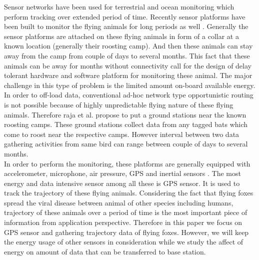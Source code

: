 \documentclass[conference]{IEEEtran}
\begin{document}
Sensor networks have been used for terrestrial \cite{robo-mote} and ocean 
monitoring \cite{Vasilescu05krill:an} which perform tracking over extended period of time. 
Recently sensor platforms have been built to monitor the flying animals for long periods as well 
\cite{Anthony:2012:STC:2185677.2185747} \cite{raja-ipsn}. Generally the sensor platforms are 
attached on these flying animals in form of a collar at a known location (generally their roosting 
camp). And then these animals can stay away from the camp from couple of days to several months. 
This fact that these animals can be away for months without connectivity call for the design of delay 
tolerant hardware and software platform for monitoring these animal. The major challenge in this type 
of problem is the limited amount on-board available energy. \\
In order to off-load data, conventional ad-hoc network type opportunistic routing is not 
possible because of highly unpredictable flying nature of these flying animals. Therefore raja et 
al.\cite{raja-ipsn} propose to put a ground stations near the known roosting camps. These 
ground stations collect data from any tagged bats which come to roost near the respective camps. 
However interval between two data gathering activities from same bird can range between couple 
of days to several months. \\ %

In order to perform the monitoring, these platforms are generally equipped with accelerometer, 
microphone, air pressure, GPS and inertial sensors \cite{raja-ipsn}. The most energy and data 
intensive sensor among all these is GPS sensor. It is used to track the trajectory of these 
flying animals. Considering the fact that flying foxes spread the viral disease between animal 
of other species including humans, trajectory of these animals over a period of time is the most 
important piece of information from application perspective. Therefore in this paper we focus 
on GPS sensor and gathering trajectory data of flying foxes. However, we will keep the energy 
usage of other sensors in consideration while we study the affect of energy on amount of data 
that can be transferred to base station.\
\end{document}
